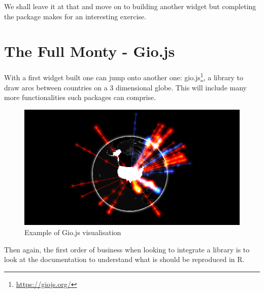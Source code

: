 \documentclass[
]{krantz}
\makeatletter
\newenvironment{Shaded}{\begin{snugshade}}{\end{snugshade}}
\newcommand{\ControlFlowTok}[1]{\textcolor[rgb]{0.27,0.27,0.27}{\textbf{#1}}}
\newcommand{\KeywordTok}[1]{\textcolor[rgb]{0.27,0.27,0.27}{\textbf{#1}}}
\newcommand{\NormalTok}[1]{#1}
\newcommand{\OperatorTok}[1]{\textcolor[rgb]{0.43,0.43,0.43}{\textbf{#1}}}
\newcommand{\StringTok}[1]{\textcolor[rgb]{0.5,0.5,0.5}{#1}}
\renewcommand{\href}[2]{#2\footnote{\url{#1}}}
\newenvironment{kframe}{%
\medskip{}
\setlength{\fboxsep}{.8em}
 \def\at@end@of@kframe{}%
 \ifinner\ifhmode%
  \def\at@end@of@kframe{\end{minipage}}%
  \begin{minipage}{\columnwidth}%
 \fi\fi%
 \def\FrameCommand##1{\hskip\@totalleftmargin \hskip-\fboxsep
 \colorbox{shadecolor}{##1}\hskip-\fboxsep
     \hskip-\linewidth \hskip-\@totalleftmargin \hskip\columnwidth}%
 \MakeFramed {\advance\hsize-\width
   \@totalleftmargin\z@ \linewidth\hsize
   \@setminipage}}%
 {\par\unskip\endMakeFramed%
 \at@end@of@kframe}
\renewenvironment{Shaded}{\begin{kframe}}{\end{kframe}}
\makeatother
\begin{document}
\begin{Shaded}
\end{Shaded}

We shall leave it at that and move on to building another widget but completing the package makes for an interesting exercise.

\hypertarget{the-full-monty---gio.js}{%
\chapter{The Full Monty - Gio.js}\label{the-full-monty---gio.js}}

With a first widget built one can jump onto another one: \href{https://giojs.org/}{gio.js}, a library to draw arcs between countries on a 3 dimensional globe. This will include many more functionalities such packages can comprise.

\begin{figure}
\centering
\includegraphics{images/gio-example.png}
\caption{Example of Gio.js visualisation}
\end{figure}

Then again, the first order of business when looking to integrate a library is to look at the documentation to understand what is should be reproduced in R.
\end{document}
